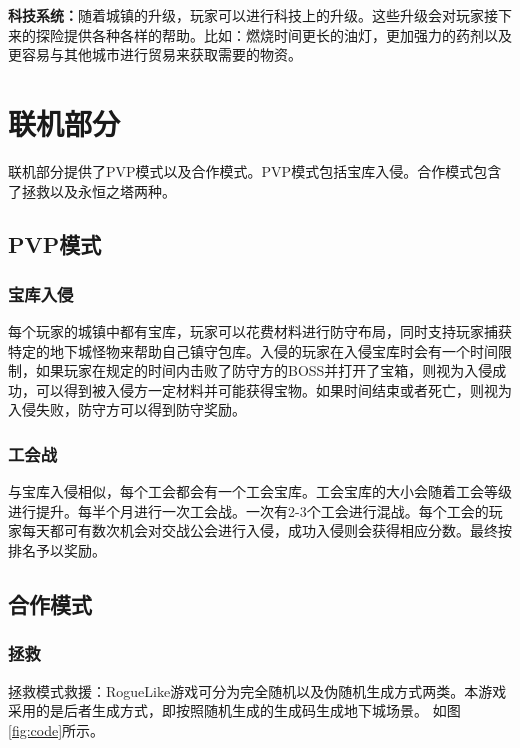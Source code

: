 \documentclass[UTF8,AutoFakeBold=1,AutoFakeSlant,zihao=-4]{cucthesis}
\begin{document}
\textbf{科技系统：}随着城镇的升级，玩家可以进行科技上的升级。这些升级会对玩家接下来的探险提供各种各样的帮助。比如：燃烧时间更长的油灯，更加强力的药剂以及更容易与其他城市进行贸易来获取需要的物资。


\section{联机部分}
联机部分提供了PVP模式以及合作模式。PVP模式包括宝库入侵。合作模式包含了拯救以及永恒之塔两种。

\subsection{PVP模式}
\subsubsection{宝库入侵}
每个玩家的城镇中都有宝库，玩家可以花费材料进行防守布局，同时支持玩家捕获特定的地下城怪物来帮助自己镇守包库。入侵的玩家在入侵宝库时会有一个时间限制，如果玩家在规定的时间内击败了防守方的BOSS并打开了宝箱，则视为入侵成功，可以得到被入侵方一定材料并可能获得宝物。如果时间结束或者死亡，则视为入侵失败，防守方可以得到防守奖励。
\subsubsection{工会战}
与宝库入侵相似，每个工会都会有一个工会宝库。工会宝库的大小会随着工会等级进行提升。每半个月进行一次工会战。一次有2-3个工会进行混战。每个工会的玩家每天都可有数次机会对交战公会进行入侵，成功入侵则会获得相应分数。最终按排名予以奖励。


\subsection{合作模式}
\subsubsection{拯救}
拯救模式救援：RogueLike游戏可分为完全随机以及伪随机生成方式两类。本游戏采用的是后者生成方式，即按照随机生成的生成码生成地下城场景。
如图\ref{fig:code}所示。
\end{document}
